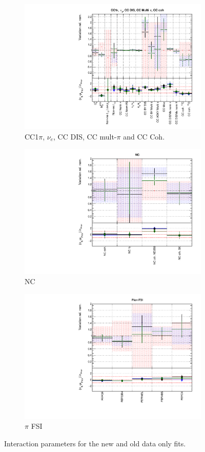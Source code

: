 \begin{figure}
\begin{subfigure}{0.49\textwidth}
  \centering
  \includegraphics[width=0.9\linewidth]{figs/newolddatafitsxsec_3}
  \caption{CC1$\pi$, $\nu_e$, CC DIS, CC mult-$\pi$ and CC Coh.}
\end{subfigure}
\begin{subfigure}{0.49\textwidth}
  \centering
  \includegraphics[width=0.9\linewidth]{figs/newolddatafitsxsec_4}
  \caption{NC}
\end{subfigure}
\begin{subfigure}{0.49\textwidth}
  \centering
  \includegraphics[width=0.9\linewidth]{figs/newolddatafitsxsec_5}
  \caption{$\pi$ FSI}
\end{subfigure}
\caption{Interaction parameters for the new and old data only fits.}
\label{fig:newolddataxsec}
\end{figure}

